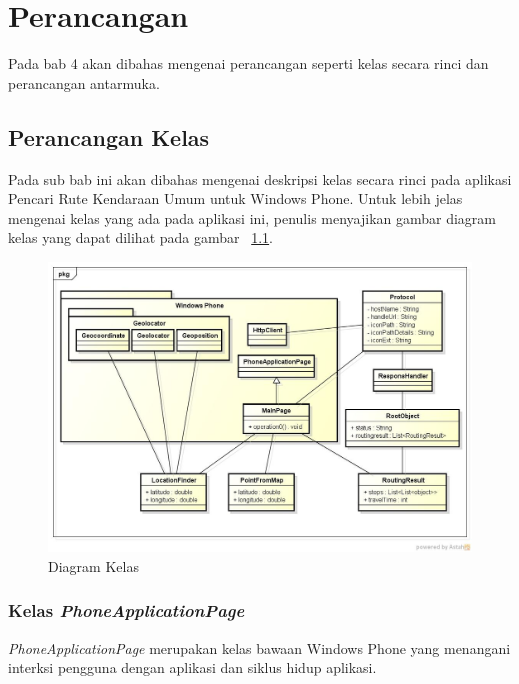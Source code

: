 \chapter{Perancangan}
\label{chap:Perancangan}

Pada bab 4 akan dibahas mengenai perancangan seperti kelas secara rinci dan perancangan antarmuka.

\section{Perancangan Kelas}
\label{lab:Perancangan Kelas}
\hspace{0.5cm} Pada sub bab ini akan dibahas mengenai deskripsi kelas secara rinci pada aplikasi Pencari Rute Kendaraan Umum untuk Windows Phone. Untuk lebih jelas mengenai kelas yang ada pada aplikasi ini, penulis menyajikan gambar diagram kelas yang dapat dilihat pada  gambar ~\ref{fig:kelas}. 

\begin{figure}[h]
	\centering
		\includegraphics[scale=0.4]{Gambar/useCase_dan_Class/class}
	\caption{Diagram Kelas}
	\label{fig:kelas}
\end{figure}

\subsection{Kelas \textit{PhoneApplicationPage}}
\label{lab:Kelas PhoneApplicationPage}
\hspace{0.5cm} \textit{PhoneApplicationPage} merupakan kelas bawaan Windows Phone yang menangani interksi pengguna dengan aplikasi dan siklus hidup aplikasi.

